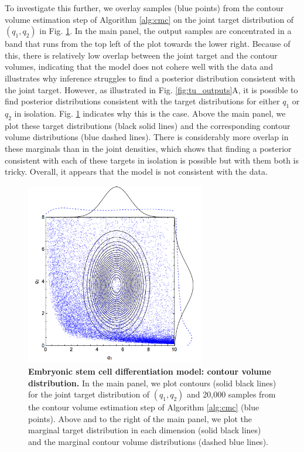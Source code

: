 To investigate this further, we overlay samples (blue points) from the contour volume estimation step of Algorithm \ref{alg:cmc} on the joint target distribution of $(q_1,q_2)$ in Fig. \ref{fig:tu_contours}. In the main panel, the output samples are concentrated in a band that runs from the top left of the plot towards the lower right. Because of this, there is relatively low overlap between the joint target and the contour volumes, indicating that the model does not cohere well with the data and illustrates why inference struggles to find a posterior distribution consistent with the joint target. However, as illustrated in Fig. \ref{fig:tu_outputs}A, it is possible to find posterior distributions consistent with the target distributions for either $q_1$ or $q_2$ in isolation. Fig. \ref{fig:tu_contours} indicates why this is the case. Above the main panel, we plot these target distributions (black solid lines) and the corresponding contour volume distributions (blue dashed lines). There is considerably more overlap in these marginals than in the joint densities, which shows that finding a posterior consistent with each of these targets in isolation is possible but with them both is tricky. Overall, it appears that the model is not consistent with the data.

\begin{figure}[H]
	\centerline{\includegraphics[width=0.7\textwidth]{../figures/tu_contours.png}}
	\caption{\textbf{Embryonic stem cell differentiation model: contour volume distribution.} In the main panel, we plot contours (solid black lines) for the joint target distribution of $(q_1,q_2)$ and 20,000 samples from the contour volume estimation step of Algorithm \ref{alg:cmc} (blue points). Above and to the right of the main panel, we plot the marginal target distribution in each dimension (solid black lines) and the marginal contour volume distributions (dashed blue lines).}
	\label{fig:tu_contours}
\end{figure}

